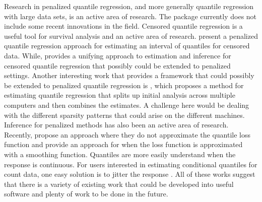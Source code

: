 Research in penalized quantile regression, and more generally quantile regression with large data sets, is an active area of research. The package currently does not include some recent innovations in the field. Censored quantile regression is a useful tool for survival analysis and an active area of research. \citet{hdCensQR} present a penalized quantile regression approach for estimating an interval of quantiles for censored data. While, \citet{effCenQR} provides a unifying approach to estimation and inference for censored quantile regression that possibly could be extended to penalized settings. Another interesting work that provides a framework that could possibly be extended to penalized quantile regression is \citet{qrDist}, which proposes a method for estimating quantile regression that splits up initial analysis across multiple computers and then combines the estimates. A challenge here would be dealing with the different sparsity patterns that could arise on the different machines. Inference for penalized methods has also been an active area of research. Recently, \citet{validQRInf} propose an approach where they do not approximate the quantile loss function and \citet{ciHypHDQR} provide an approach for when the loss function is approximated with a smoothing function. Quantiles are more easily understand when the response is continuous. For users interested in estimating conditional quantiles for count data, one easy solution is to jitter the response \citep{quantileCount}. All of these works suggest that there is a variety of existing work that could be developed into useful software and plenty of work to be done in the future.



\address{%
Ben Sherwood\\
University of Kansas\\%
School of Business\\ Lawrence, KS\\
%
%
%
\href{mailto:ben.sherwood@ku.edu}{\nolinkurl{ben.sherwood@ku.edu}}%
}

\address{%
Shaobo Li\\
University of Kansas\\%
School of Business\\ Lawrence, KS\\
%
%
%
\href{mailto:shaobo.li@ku.edu}{\nolinkurl{shaobo.li@ku.edu}}%
}

\address{%
Adam Maidman\\
University of Minnesota\\%
School of Statistics\\ Minneapolis, MN\\
%
%
%
\href{mailto:abmaidman@gmail.com}{\nolinkurl{abmaidman@gmail.com}}%
}

